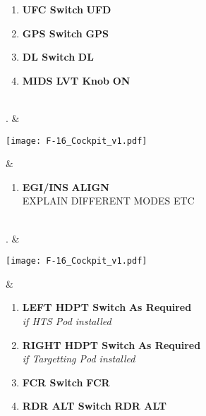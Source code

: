 \documentclass[fontInter]{TechCheck}
\begin{document}
\begin{listlongtable}
\begin{minipage}[t]{\linewidth}
\begin{enumerate}
				\item \textbf{UFC Switch} \dotfill \textbf{UFD}
				\item \textbf{GPS Switch} \dotfill \textbf{GPS}
				\item \textbf{DL Switch} \dotfill \textbf{DL}
				\item \textbf{MIDS LVT Knob} \dotfill \textbf{ON}
			\end{enumerate}
		\end{minipage} \\
		. & 
		\begin{minipage}[t]{\linewidth}
			\vspace{-7pt}
			\centering
			\texttt{[image: F-16\_Cockpit\_v1.pdf]}
		\end{minipage} &
		\begin{minipage}[t]{\linewidth}
			\vspace{-7pt}
			\begin{enumerate}
				\item \textbf{EGI/INS} \dotfill \textbf{ALIGN} \\
				EXPLAIN DIFFERENT MODES ETC
			\end{enumerate}
		\end{minipage} \\
		. & 
		\begin{minipage}[t]{\linewidth}
			\vspace{-7pt}
			\centering
			\texttt{[image: F-16\_Cockpit\_v1.pdf]}
		\end{minipage} &
		\begin{minipage}[t]{\linewidth}
			\vspace{-7pt}
			\begin{enumerate}
				\item \textbf{LEFT HDPT Switch} \dotfill \textbf{As Required} \\
				\hfill \emph{if HTS Pod installed}
				\item \textbf{RIGHT HDPT Switch} \dotfill \textbf{As Required} \\
				\hfill \emph{if Targetting Pod installed}
				\item \textbf{FCR Switch} \dotfill \textbf{FCR}
				\item \textbf{RDR ALT Switch} \dotfill \textbf{RDR ALT} 
			\end{enumerate}
		\end{minipage} \\
	\end{listlongtable}
\end{document}
